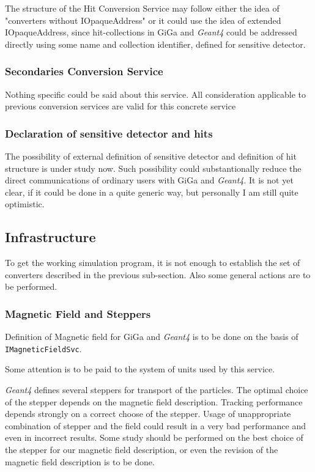 \documentclass[nfss,times,12pt,a4paper]{article}
\begin{document}
The structure of the Hit Conversion Service may 
follow either the idea of "converters without IOpaqueAddress" 
or it could use the idea of extended IOpaqueAddress, since
hit-collections in {\sc GiGa} and {\it Geant4} could be addressed 
directly using some name and collection identifier, defined 
for sensitive detector.

  \subsubsection{ Secondaries Conversion Service }

Nothing specific could be said about this service. 
All consideration applicable to previous conversion 
services are valid for this concrete service 

  \subsubsection{ Declaration of sensitive detector and hits } 

The possibility  of external definition of sensitive detector 
and definition of hit structure is under study now. Such 
possibility could substantionally reduce the direct 
communications of ordinary users with {\sc GiGa} and {\it Geant4}.  
It is not yet clear, if it could be done in a quite generic way, 
but personally I am still quite optimistic.
 
\subsection{ Infrastructure       }

To get the working simulation program, it is not enough 
to establish the set of converters described in the previous 
sub-section. Also some general actions are to be performed. 

  \subsubsection{ Magnetic Field and Steppers } 

  Definition of Magnetic field for {\sc GiGa} and {\it Geant4} 
is to be done on the basis of {\tt IMagneticFieldSvc}. 

Some attention is to be paid to the system of units used by this service.

{\it Geant4} defines several steppers for transport 
of the particles. The optimal choice of the stepper 
depends on the magnetic field description. 
Tracking performance depends strongly on a correct 
choose of the stepper. Usage of  unappropriate combination of stepper 
and the field could result in a very bad performance and even in 
incorrect results. Some study should be performed on the best choice 
of the stepper for our magnetic field description, or even the 
revision of the magnetic field description is to be done. 
  
\end{document}
